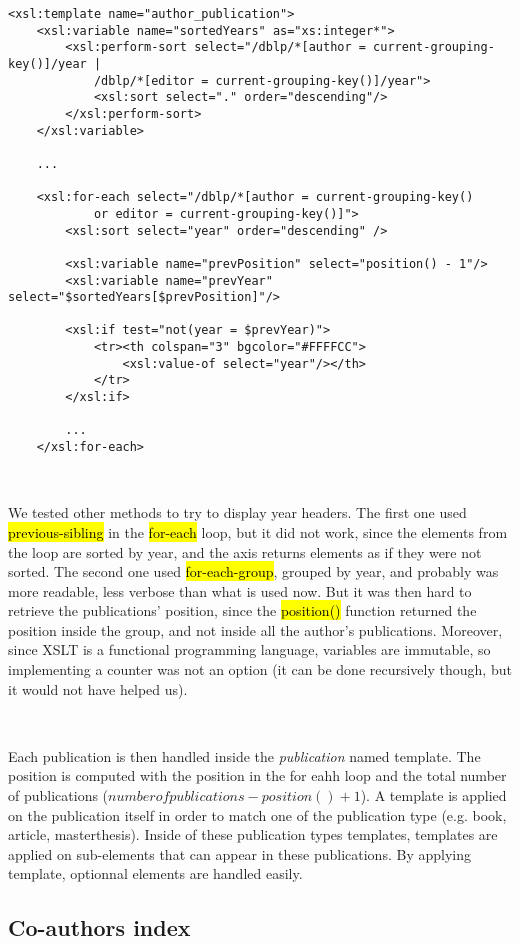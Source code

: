 \begin{lstlisting}
<xsl:template name="author_publication">
    <xsl:variable name="sortedYears" as="xs:integer*">
        <xsl:perform-sort select="/dblp/*[author = current-grouping-key()]/year |
            /dblp/*[editor = current-grouping-key()]/year">
            <xsl:sort select="." order="descending"/>
        </xsl:perform-sort>
    </xsl:variable>

    ...

    <xsl:for-each select="/dblp/*[author = current-grouping-key()
            or editor = current-grouping-key()]">
        <xsl:sort select="year" order="descending" />

        <xsl:variable name="prevPosition" select="position() - 1"/>
        <xsl:variable name="prevYear" select="$sortedYears[$prevPosition]"/>

        <xsl:if test="not(year = $prevYear)">
            <tr><th colspan="3" bgcolor="#FFFFCC">
                <xsl:value-of select="year"/></th>
            </tr>
        </xsl:if>

        ...
    </xsl:for-each>
\end{lstlisting}
\

\begin{framewarning}
We tested other methods to try to display year headers. The first one used
\hl{previous-sibling} in the \hl{for-each} loop, but it did not work, since the
elements from the loop are sorted by year, and the axis returns elements as if
they were not sorted. The second one used \hl{for-each-group}, grouped by year,
and probably was more readable, less verbose than what is used now. But it was
then hard to retrieve the publications' position, since the \hl{position()}
function returned the position inside the group, and not inside all the author's
publications. Moreover, since XSLT is a functional programming language, variables
are immutable, so implementing a counter was not an option (it can be done
recursively though, but it would not have helped us).
\end{framewarning}
\

Each publication is then handled inside the \emph{publication} named template.
The position is computed with the position in the for eahh loop and the total
number of publications ($number of publications - position() + 1$). A template
is applied on the publication itself in order to match one of the publication
type (e.g. book, article, masterthesis). Inside of these publication types
templates, templates are applied on sub-elements that can appear in these
publications. By applying template, optionnal elements are handled easily.
\newpage

\subsection{Co-authors index}
\newpage

